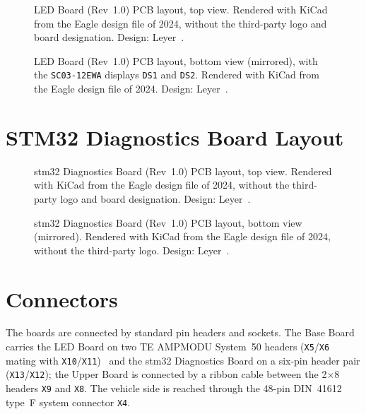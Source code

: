 \label{sec:app_led_board_schematics}
\begin{figure}[H]
	\centering
	\caption[LED Board Layout (Top)]{LED Board (Rev~1.0) PCB layout, top view. Rendered with KiCad from the Eagle design file of 2024, without the third-party logo and board designation. Design: Leyer~\cite{leyer2023}.}
	\label{fig:led_layout_top}
\end{figure}

\begin{figure}[H]
	\centering
	\caption[LED Board Layout (Bottom)]{LED Board (Rev~1.0) PCB layout, bottom view (mirrored), with the \texttt{SC03-12EWA} displays \texttt{DS1} and \texttt{DS2}. Rendered with KiCad from the Eagle design file of 2024. Design: Leyer~\cite{leyer2023}.}
	\label{fig:led_layout_bottom}
\end{figure}


\section{STM32 Diagnostics Board Layout}
\label{sec:app_stm32_board_schematics}

\begin{figure}[H]
	\centering
	\caption[STM32 Board Layout (Top)]{\gls{stm32} Diagnostics Board (Rev~1.0) PCB layout, top view. Rendered with KiCad from the Eagle design file of 2024, without the third-party logo and board designation. Design: Leyer~\cite{leyer2023}.}
	\label{fig:stm32_layout_top}
\end{figure}

\begin{figure}[H]
	\centering
	\caption[STM32 Board Layout (Bottom)]{\gls{stm32} Diagnostics Board (Rev~1.0) PCB layout, bottom view (mirrored). Rendered with KiCad from the Eagle design file of 2024, without the third-party logo. Design: Leyer~\cite{leyer2023}.}
	\label{fig:stm32_layout_bottom}
\end{figure}


\section{Connectors}
\label{sec:app_connectors}
The boards are connected by standard pin headers and sockets. The Base Board carries the LED Board on two TE AMPMODU System~50 headers (\texttt{X5}/\texttt{X6} mating with \texttt{X10}/\texttt{X11})~\cite{te_ampmodu_sys50} and the \gls{stm32} Diagnostics Board on a six-pin header pair (\texttt{X13}/\texttt{X12}); the Upper Board is connected by a ribbon cable between the 2$\times$8 headers \texttt{X9} and \texttt{X8}. The vehicle side is reached through the 48-pin DIN~41612 type~F system connector \texttt{X4}.

\flushbottom
